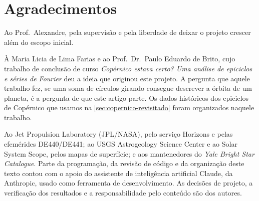 \section*{Agradecimentos}

Ao Prof.\ Alexandre, pela supervisão e pela liberdade de deixar o projeto crescer além do escopo inicial.

À Maria Licia de Lima Farias e ao Prof.\ Dr.\ Paulo Eduardo de Brito, cujo trabalho de conclusão de curso \emph{Copérnico estava certo? Uma análise de epiciclos e séries de Fourier} \cite{farias2016} deu a ideia que originou este projeto. A pergunta que aquele trabalho fez, se uma soma de círculos girando consegue descrever a órbita de um planeta, é a pergunta de que este artigo parte. Os dados históricos dos epiciclos de Copérnico que usamos na \autoref{sec:copernico-revisitado} foram organizados naquele trabalho.

Ao Jet Propulsion Laboratory (JPL/NASA), pelo serviço Horizons e pelas efemérides DE440/DE441; ao USGS Astrogeology Science Center e ao Solar System Scope, pelos mapas de superfície; e aos mantenedores do \emph{Yale Bright Star Catalogue}.
Parte da programação, da revisão de código e da organização deste texto contou com o apoio do assistente de inteligência artificial Claude, da Anthropic, usado como ferramenta de desenvolvimento. As decisões de projeto, a verificação dos resultados e a responsabilidade pelo conteúdo são dos autores.


